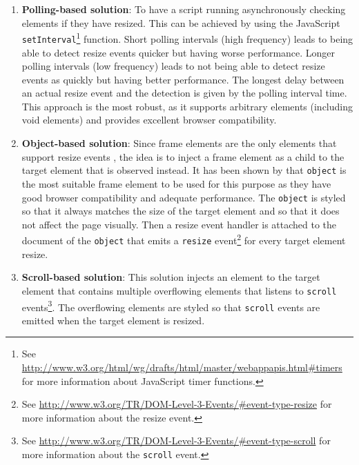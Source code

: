 \documentclass[a4paper,11pt]{kth-mag}
\newcommand{\code}[1]{\texttt{#1}}
\begin{document}
        \begin{enumerate}
          \item\label{itm:erd-approach-polling}
            \textbf{Polling-based solution}:
            To have a script running asynchronously checking \glspl{element} if they have resized.
            This can be achieved by using the \gls{JavaScript} \code{setInterval}\footnote{See \url{http://www.w3.org/html/wg/drafts/html/master/webappapis.html\#timers} for more information about \gls{JavaScript} timer functions.} function.
            Short polling intervals (high frequency) leads to being able to detect resize events quicker but having worse performance.
            Longer polling intervals (low frequency) leads to not being able to detect resize events as quickly but having better performance.
            The longest delay between an actual resize event and the detection is given by the polling interval time.
            This approach is the most robust, as it supports arbitrary \glspl{element} (including void \glspl{element}) and provides excellent \gls{browser} compatibility.
          \item\label{itm:erd-approach-object}
            \textbf{Object-based solution}:
            Since frame \glspl{element} are the only \glspl{element} that support resize events , the idea is to inject a frame \gls{element} as a child to the target \gls{element} that is observed instead.
            It has been shown by \cite{backalley} that \code{object} is the most suitable frame \gls{element} to be used for this purpose as they have good \gls{browser} compatibility and adequate performance.
            The \code{object} is styled so that it always matches the size of the target \gls{element} and so that it does not affect the page visually.
            Then a resize event handler is attached to the \gls{document} of the \code{object} that emits a \code{resize} event\footnote{See \url{http://www.w3.org/TR/DOM-Level-3-Events/\#event-type-resize} for more information about the resize event.} for every target \gls{element} resize.
          \item\label{itm:erd-approach-scroll}
            \textbf{Scroll-based solution}:
            This solution injects an \gls{element} to the target element that contains multiple overflowing \glspl{element} that listens to \code{scroll} events\footnote{See \url{http://www.w3.org/TR/DOM-Level-3-Events/\#event-type-scroll} for more information about the \code{scroll} event.}.
            The overflowing \glspl{element} are styled so that \code{scroll} events are emitted when the target \gls{element} is resized.

\end{enumerate}
\end{document}
